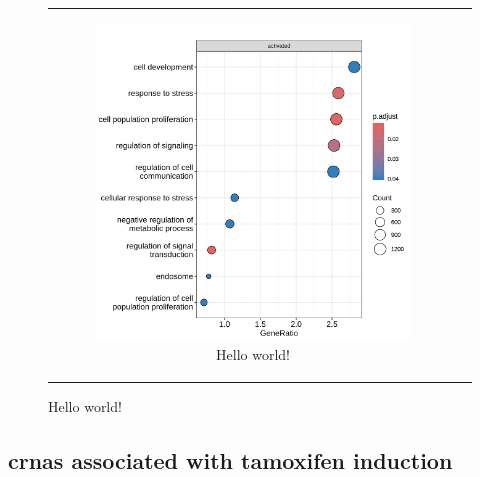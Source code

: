 \begin{figure}[H]
\begin{tabular}{cc}
\begin{subfigure}{0.5\textwidth}
            \includegraphics[width=\linewidth]{chapters/4_results_and_discussion/figures/dea/deseq2/esr1/dot.png}
            \caption{Hello world!
            }
            \label{fig:esr1_go_terms}
        \end{subfigure} &

    \end{tabular}
    \caption{Hello world!
    }
    \label{fig:dea_esr1}
\end{figure}

\subsection{\Glspl{crna} associated with tamoxifen induction}

